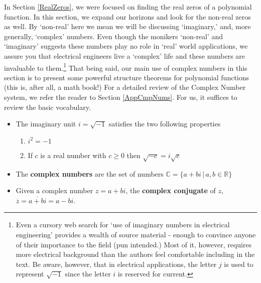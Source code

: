 \documentclass{ximera}
\begin{document}
	\author{Stitz-Zeager}




\setcounter{footnote}{0}

\label{ComplexZeros}

In Section \ref{RealZeros}, we were focused on finding the real zeros of a polynomial function.  In this section, we expand our horizons and look for the non-real zeros as well. By `non-real' here we mean we will be discussing `imaginary,' and, more generally, `complex' numbers.  Even though the monikers `non-real' and `imaginary' suggests these numbers play no role in `real' world applications, we assure you that electrical engineers live a `complex' life and these numbers are invaluable to them.\footnote{Even a cursory web search for `use of imaginary numbers in electrical engineering' provides a wealth of source material - enough to convince anyone of their importance to the field (pun intended.)  Most of it, however, requires more electrical background than the authors feel comfortable including in the text.  Be aware, however, that in electrical applications, the letter $j$ is used to represent $\sqrt{-1}$ since the letter $i$ is reserved for current.}  That being said, our main use of complex numbers in this section is to present some powerful structure theorems for polynomial functions (this is, after all, a math book!)  For a detailed review of the Complex Number system, we refer the reader to Section \ref{AppCmpNums}.  For us, it suffices to review the basic vocabulary.  

\colorbox{ResultColor}{\bbm

\begin{itemize}
 
\item The imaginary unit $i = \sqrt{-1}$ satisfies the two following properties

\begin{enumerate}

\item  $i^2 = -1$

\item  If $c$ is a real number with $c \geq 0$ then $\sqrt{-c} = i \sqrt{c}$

\end{enumerate}

\item The \textbf{complex numbers} are the set of numbers $\mathbb{C} = \{ a + bi \, | \, a, b \in \mathbb{R} \}$

\item  Given a complex number $z = a+bi$, the \textbf{complex conjugate} of $z$, $\overline{z}  = \overline{a+bi} = a - bi$.

\end{itemize}

\ebm}
\end{document}
